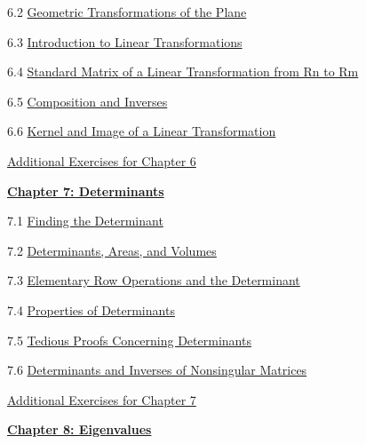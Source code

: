 \documentclass{ximera}
\begin{document}
6.2	\href{https://ximera.osu.edu/linearalgebradzv3/LinearAlgebraInteractiveIntro/LTR-0070/main}{Geometric Transformations of the Plane}
	
6.3	\href{https://ximera.osu.edu/linearalgebradzv3/LinearAlgebraInteractiveIntro/LTR-0010/main}{Introduction to Linear Transformations}
	
6.4	\href{https://ximera.osu.edu/linearalgebradzv3/LinearAlgebraInteractiveIntro/LTR-0020/main}{Standard Matrix of a Linear Transformation from Rn to Rm}
	
6.5	\href{https://ximera.osu.edu/linearalgebradzv3/LinearAlgebraInteractiveIntro/LTR-0030/main}{Composition and Inverses}
	
6.6	\href{https://ximera.osu.edu/linearalgebradzv3/LinearAlgebraInteractiveIntro/LTR-0050/main}{Kernel and Image of a Linear Transformation}
	
\href{https://ximera.osu.edu/linearalgebradzv3/LinearAlgebraInteractiveIntro/SUPX-0060/main}{Additional Exercises for Chapter 6}
	
\href{https://ximera.osu.edu/linearalgebradzv3/LinearAlgebraInteractiveIntro/XLAChapter_det/main}{\textbf{Chapter 7: Determinants}}
	
7.1	\href{https://ximera.osu.edu/linearalgebradzv3/LinearAlgebraInteractiveIntro/DET-0010/main}{Finding the Determinant}
	
7.2	\href{https://ximera.osu.edu/linearalgebradzv3/LinearAlgebraInteractiveIntro/DET-0070/main}{Determinants, Areas, and Volumes}
	
7.3	\href{https://ximera.osu.edu/linearalgebradzv3/LinearAlgebraInteractiveIntro/DET-0030/main}{Elementary Row Operations and the Determinant}
	
7.4	\href{https://ximera.osu.edu/linearalgebradzv3/LinearAlgebraInteractiveIntro/DET-0040/main}{Properties of Determinants}
	
7.5	\href{https://ximera.osu.edu/linearalgebradzv3/LinearAlgebraInteractiveIntro/DET-0050/main}{Tedious Proofs Concerning Determinants}
	
7.6	\href{https://ximera.osu.edu/linearalgebradzv3/LinearAlgebraInteractiveIntro/DET-0060/main}{Determinants and Inverses of Nonsingular Matrices}
	
\href{https://ximera.osu.edu/linearalgebradzv3/LinearAlgebraInteractiveIntro/SUPX-0070/main}{Additional Exercises for Chapter 7}
	
\href{https://ximera.osu.edu/linearalgebradzv3/LinearAlgebraInteractiveIntro/XLAChapter_eigenvalues/main}{\textbf{Chapter 8: Eigenvalues}}
	
\end{document}
